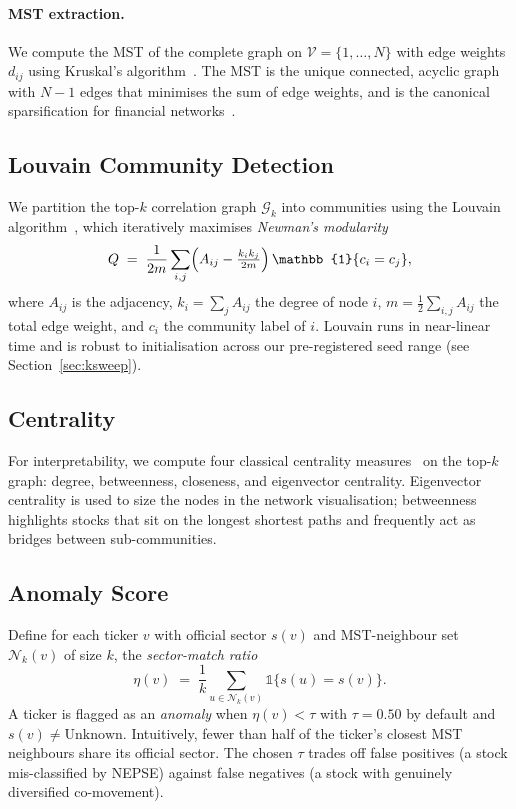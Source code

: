 \paragraph{MST extraction.}
We compute the MST of the complete graph on $\mathcal{V}=\{1,\dots,N\}$
with edge weights $d_{ij}$ using Kruskal's
algorithm~\cite{kruskal1956shortest}.  The MST is the unique connected,
acyclic graph with $N-1$ edges that minimises the sum of edge weights,
and is the canonical sparsification for financial
networks~\cite{bonanno2001topology, aste2010correlation}.

\subsection{Louvain Community Detection}
\label{sec:louvain}

We partition the top-$k$ correlation graph $\mathcal{G}_k$ into
communities using the Louvain algorithm~\cite{blondel2008fast}, which
iteratively maximises \emph{Newman's
modularity}~\cite{newman2006modularity}
\begin{equation}
  Q \;=\;
  \frac{1}{2m}\sum_{i,j}
  \Bigl(A_{ij}-\tfrac{k_i k_j}{2m}\Bigr)
  \,\mathbb{1}\{c_i=c_j\},
  \label{eq:modularity}
\end{equation}
where $A_{ij}$ is the adjacency, $k_i=\sum_j A_{ij}$ the degree of
node $i$, $m=\tfrac{1}{2}\sum_{i,j} A_{ij}$ the total edge weight, and
$c_i$ the community label of $i$.  Louvain runs in near-linear time
and is robust to initialisation across our pre-registered seed range
(see Section~\ref{sec:ksweep}).

\subsection{Centrality}
\label{sec:centrality}

For interpretability, we compute four classical centrality
measures~\cite{newman2003structure} on the top-$k$ graph: degree,
betweenness, closeness, and eigenvector centrality.  Eigenvector
centrality is used to size the nodes in the network visualisation;
betweenness highlights stocks that sit on the longest shortest paths
and frequently act as bridges between sub-communities.

\subsection{Anomaly Score}
\label{sec:anomaly}

Define for each ticker $v$ with official sector $s(v)$ and MST-neighbour
set $\mathcal{N}_k(v)$ of size $k$, the \emph{sector-match ratio}
\begin{equation}
  \eta(v) \;=\;
  \frac{1}{k}\sum_{u\in\mathcal{N}_k(v)}
    \mathbb{1}\{s(u)=s(v)\}.
  \label{eq:etadef}
\end{equation}
A ticker is flagged as an \emph{anomaly} when $\eta(v)<\tau$ with
$\tau=0.50$ by default and $s(v)\ne\text{Unknown}$.  Intuitively,
fewer than half of the ticker's closest MST neighbours share its
official sector.  The chosen $\tau$ trades off false positives (a
stock mis-classified by NEPSE) against false negatives (a stock with
genuinely diversified co-movement).

